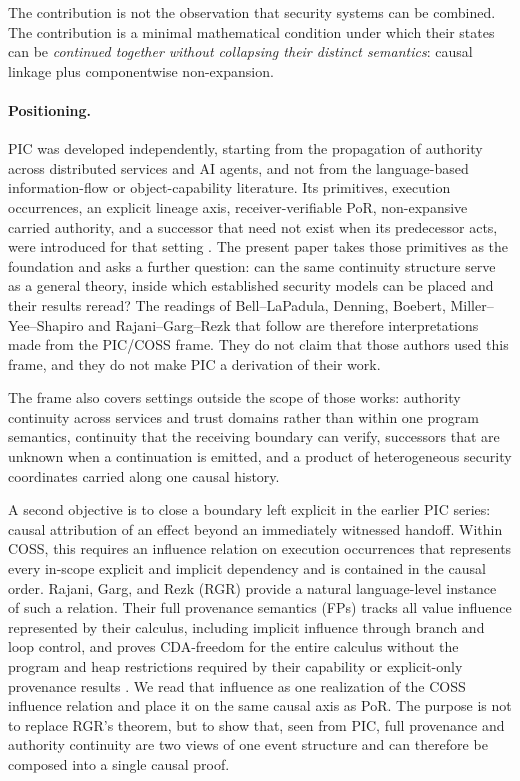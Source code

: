 \documentclass[10pt,twocolumn]{article}
\newcommand{\Model}{\textnormal{\textsc{COSS}}\xspace}
\begin{document}
The contribution is not the observation that security systems can be combined.
The contribution is a minimal mathematical condition under which their states
can be \emph{continued together without collapsing their distinct semantics}:
causal linkage plus componentwise non-expansion.


\paragraph{Positioning.}
PIC was developed independently, starting from the propagation of authority
across distributed services and AI agents, and not from the language-based
information-flow or object-capability literature. Its primitives, execution
occurrences, an explicit lineage axis, receiver-verifiable PoR, non-expansive
carried authority, and a successor that need not exist when its predecessor
acts, were introduced for that setting \cite{gallo_poc2026,gallo_relational2026}.
The present paper takes those primitives as the foundation and asks a further
question: can the same continuity structure serve as a general theory, inside
which established security models can be placed and their results reread?
The readings of Bell--LaPadula, Denning, Boebert, Miller--Yee--Shapiro and
Rajani--Garg--Rezk that follow are therefore interpretations made from the
PIC/\Model frame. They do not claim that those authors used this frame, and
they do not make PIC a derivation of their work.

The frame also covers settings outside the scope of those works: authority
continuity across services and trust domains rather than within one program
semantics, continuity that the receiving boundary can verify, successors that
are unknown when a continuation is emitted, and a product of heterogeneous
security coordinates carried along one causal history.

A second objective is to close a boundary left explicit in the earlier PIC
series: causal attribution of an effect beyond an immediately witnessed
handoff. Within \Model, this requires an influence relation on execution
occurrences that represents every in-scope explicit and implicit dependency
and is contained in the causal order. Rajani, Garg, and Rezk (RGR) provide a
natural language-level instance of such a relation. Their full provenance
semantics (FPs) tracks all value influence represented by their calculus,
including implicit influence through branch and loop control, and proves
CDA-freedom for the entire calculus without the program and heap restrictions
required by their capability or explicit-only provenance results
\cite{rajani_garg_rezk2016}. We read that influence as one realization of the
\Model influence relation and place it on the same causal axis as PoR. The
purpose is not to replace RGR's theorem, but to show that, seen from PIC,
full provenance and authority continuity are two views of one event structure
and can therefore be composed into a single causal proof.
\end{document}
